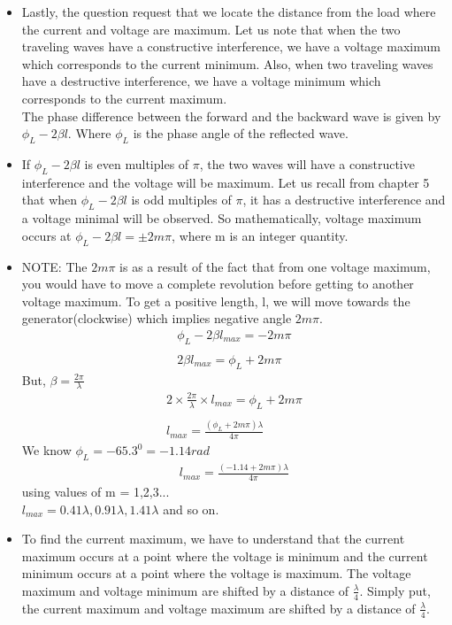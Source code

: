 \begin{itemize}
	\item Lastly, the question request that we locate the distance from the load where the current and voltage are maximum. Let us note that when the two traveling waves have a constructive interference, we have a voltage maximum which corresponds to the current minimum. Also, when two traveling waves have a destructive interference, we have a voltage minimum which corresponds to the current maximum.\\
	The phase difference between the forward and the backward wave is given by $\phi_{L}-2\beta l$. Where $\phi_L$ is the phase angle of the reflected wave.
	
	\item
	If $\phi_{L}-2\beta l$ is even multiples of $\pi$, the two waves will  have a constructive interference and the voltage will be maximum. Let us recall from chapter 5 that when $\phi_{L}-2\beta l$ is odd multiples of $\pi$, it has a destructive interference and a voltage minimal will be observed. So mathematically, voltage maximum occurs at $\phi_{L}-2\beta l= \pm2m\pi$, where m is an integer quantity.
	
	\item
	NOTE: The $2m\pi$ is as a result of the fact that from one voltage maximum, you would have to move a complete revolution before getting to another voltage maximum. To get a positive length, l, we will move towards the generator(clockwise) which implies negative angle $2m\pi$.
    \begin{align*}
    \phi_{L}-2\beta l_{max}=-2m\pi\\\\
    2\beta l_{max}= \phi_{L}+2m\pi
    \end{align*}
    But, $\beta = \frac{2\pi}{\lambda}$
    \begin{align*}
    2 \times \frac{2\pi}{\lambda}\times l_{max}= \phi_{L}+2m\pi\\\\
    l_{max}=\frac{(\phi_L + 2m\pi)\lambda}{4\pi}
    \end{align*}
    We know $\phi_{L}=-65.3^{0}=-1.14rad$
    \begin{align*}
    l_{max}=\frac{(-1.14 + 2m\pi)\lambda}{4\pi}
    \end{align*}
	using values of m = 1,2,3...\\
	$l_{max}=0.41\lambda , 0.91\lambda, 1.41\lambda$ and so on.
	
	\item
	To find the current maximum, we have to understand that the current maximum occurs at a point where the voltage is minimum and the current minimum occurs at a point where the voltage is maximum. The voltage maximum and voltage minimum are shifted by a distance of $\frac{\lambda}{4}$. Simply put, the current maximum and voltage maximum are shifted by a distance of $\frac{\lambda}{4}$.\\
	

\end{itemize}
